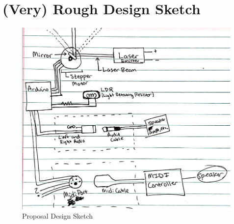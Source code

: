 \documentclass[prb,preprint]{revtex4-1}
\begin{document}
\pagebreak

\section{(Very) Rough Design Sketch}
\begin{figure}[ht]
	\centering
	\includegraphics[width=5.75in]{design.png}
	\caption{Proposal Design Sketch}
	\label{fig1}
\end{figure}
\end{document}

